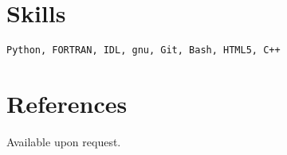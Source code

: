 \documentclass[margin,line]{cv}
\begin{document}
\begin{resume}
\begin{etaremune}
\end{etaremune}

\section{\sc Skills}
\texttt{Python, FORTRAN, IDL, gnu, Git, Bash, HTML5, C++}


\section{\sc References }
Available upon request.

\end{resume}
\end{document}
